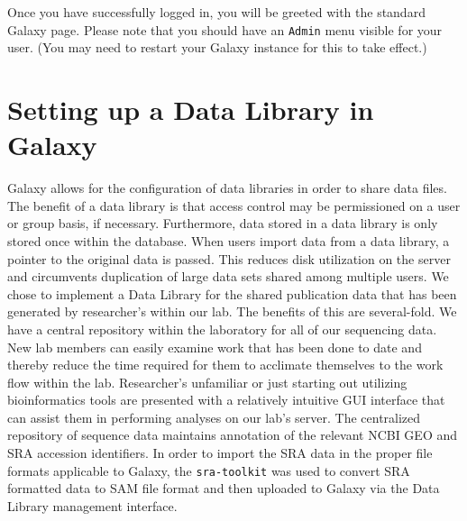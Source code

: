 \documentclass[a4paper,10pt]{article}
\begin{document}
Once you have successfully logged in, you will be greeted with the standard Galaxy page.  Please note that you should have an \texttt{\footnotesize{Admin}} menu visible for your user.  (You may need to restart your Galaxy instance for this to take effect.)\vspace{1em}\\
\setlength\fboxsep{0pt}\vspace{1em}

\section{Setting up a Data Library in Galaxy}
Galaxy allows for the configuration of data libraries in order to share data files.  The benefit of a data library is that access control may be permissioned on a user or group basis, if necessary.  Furthermore, data stored in a data library is only stored once within the database.  When users import data from a data library, a pointer to the original data is passed.  This reduces disk utilization on the server and circumvents duplication of large data sets shared among multiple users.
We chose to implement a Data Library for the shared publication data that has been generated by researcher's within our lab.  The benefits of this are several-fold.  We have a central repository within the laboratory for all of our sequencing data.  New lab members can easily examine work that has been done to date and thereby reduce the time required for them to acclimate themselves to the work flow within the lab.  Researcher's unfamiliar or just starting out utilizing bioinformatics tools are presented with a relatively intuitive GUI interface that can assist them in performing analyses on our lab's server.  The centralized repository of sequence data maintains annotation of the relevant NCBI GEO and SRA accession identifiers.  In order to import the SRA data in the proper file formats applicable to Galaxy, the \texttt{\footnotesize{sra-toolkit}} was used to convert SRA formatted data to SAM file format and then uploaded to Galaxy via the Data Library management interface.
\pagebreak
\end{document}
